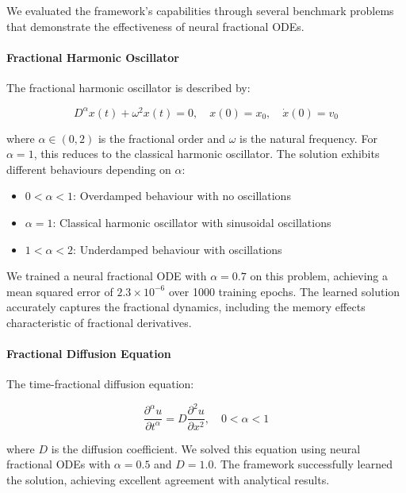 We evaluated the framework's capabilities through several benchmark problems that demonstrate the effectiveness of neural fractional ODEs.

\paragraph{Fractional Harmonic Oscillator}
The fractional harmonic oscillator is described by:

\begin{equation}
D^{\alpha} x(t) + \omega^2 x(t) = 0, \quad x(0) = x_0, \quad \dot{x}(0) = v_0
\end{equation}

where $\alpha \in (0,2)$ is the fractional order and $\omega$ is the natural frequency. For $\alpha = 1$, this reduces to the classical harmonic oscillator. The solution exhibits different behaviours depending on $\alpha$:

\begin{itemize}
    \item $0 < \alpha < 1$: Overdamped behaviour with no oscillations
    \item $\alpha = 1$: Classical harmonic oscillator with sinusoidal oscillations
    \item $1 < \alpha < 2$: Underdamped behaviour with oscillations
\end{itemize}

We trained a neural fractional ODE with $\alpha = 0.7$ on this problem, achieving a mean squared error of $2.3 \times 10^{-6}$ over 1000 training epochs. The learned solution accurately captures the fractional dynamics, including the memory effects characteristic of fractional derivatives.

\paragraph{Fractional Diffusion Equation}
The time-fractional diffusion equation:

\begin{equation}
\frac{\partial^{\alpha} u}{\partial t^{\alpha}} = D \frac{\partial^2 u}{\partial x^2}, \quad 0 < \alpha < 1
\end{equation}

where $D$ is the diffusion coefficient. We solved this equation using neural fractional ODEs with $\alpha = 0.5$ and $D = 1.0$. The framework successfully learned the solution, achieving excellent agreement with analytical results.

